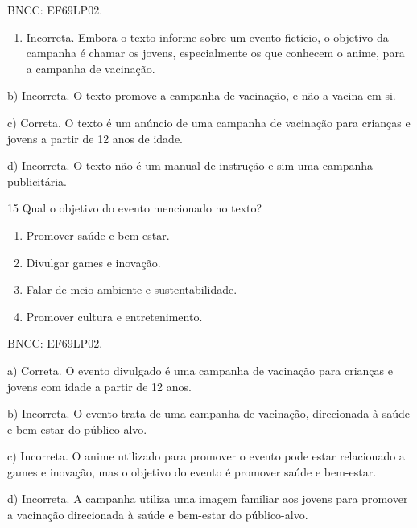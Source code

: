 BNCC: EF69LP02.

\begin{enumerate}
\def\labelenumi{\alph{enumi})}
\tightlist
\item
  Incorreta. Embora o texto informe sobre um evento fictício, o objetivo
  da campanha é chamar os jovens, especialmente os que conhecem o anime,
  para a campanha de vacinação.
\end{enumerate}

b) Incorreta. O texto promove a campanha de vacinação, e não a vacina em
si.

c) Correta. O texto é um anúncio de uma campanha de vacinação para
crianças e jovens a partir de 12 anos de idade.

d) Incorreta. O texto não é um manual de instrução e sim uma campanha
publicitária.

\num{15} Qual o objetivo do evento mencionado no texto?

\begin{enumerate}
\def\labelenumi{\alph{enumi})}
\item
  Promover saúde e bem-estar.
\item
  Divulgar games e inovação.
\item
  Falar de meio-ambiente e sustentabilidade.
\item
  Promover cultura e entretenimento.
\end{enumerate}

BNCC: EF69LP02.

a) Correta. O evento divulgado é uma campanha de vacinação para crianças
e jovens com idade a partir de 12 anos.

b) Incorreta. O evento trata de uma campanha de vacinação, direcionada à
saúde e bem-estar do público-alvo.

c) Incorreta. O anime utilizado para promover o evento pode estar
relacionado a games e inovação, mas o objetivo do evento é promover
saúde e bem-estar.

d) Incorreta. A campanha utiliza uma imagem familiar aos jovens para
promover a vacinação direcionada à saúde e bem-estar do público-alvo.

